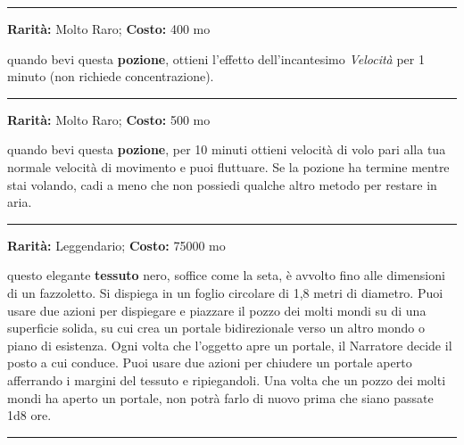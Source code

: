 \begin{multicols}{2}
\smallskip\noindent\rule{\linewidth}{2pt}  \hypertarget{PozionediVelocità}{}\smallskip{}\noindent\label{PozionediVelocità}

\textbf{Rarità:} Molto Raro; \textbf{Costo:} 400 mo

quando bevi questa \textbf{pozione}, ottieni l'effetto dell'incantesimo \emph{Velocità} per 1 minuto (non richiede concentrazione).

\smallskip\noindent\rule{\linewidth}{2pt}  \hypertarget{PozionediVolo}{}\smallskip{}\noindent\label{PozionediVolo}

\textbf{Rarità:} Molto Raro; \textbf{Costo:} 500 mo

quando bevi questa \textbf{pozione}, per 10 minuti ottieni velocità di volo pari alla tua normale velocità di movimento e puoi fluttuare. Se la pozione ha termine mentre stai volando, cadi a meno che non possiedi qualche altro metodo per restare in aria.

\smallskip\noindent\rule{\linewidth}{2pt}  \hypertarget{PozzodeiMoltiMondi}{}\smallskip{}\noindent\label{PozzodeiMoltiMondi}

\textbf{Rarità:} Leggendario; \textbf{Costo:} 75000 mo

questo elegante \textbf{tessuto} nero, soffice come la seta, è avvolto fino alle dimensioni di un fazzoletto. Si dispiega in un foglio circolare di 1,8 metri di diametro. Puoi usare due azioni per dispiegare e piazzare il pozzo dei molti mondi su di una superficie solida, su cui crea un portale bidirezionale verso un altro mondo o piano di esistenza. Ogni volta che l'oggetto apre un portale, il Narratore decide il posto a cui conduce. Puoi usare due azioni per chiudere un portale aperto afferrando i margini del tessuto e ripiegandoli. Una volta che un pozzo dei molti mondi ha aperto un portale, non potrà farlo di nuovo prima che siano passate 1d8 ore.

\smallskip\noindent\rule{\linewidth}{2pt}  \hypertarget{ResistenzaalVeleno}{}\smallskip{}\noindent\label{ResistenzaalVeleno}


\end{multicols}
